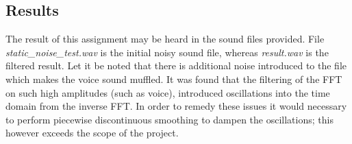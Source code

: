 \subsection{Results} %
\label{sub:results}
The result of this assignment may be heard in the sound files provided. File \emph{static\_noise\_test.wav} is the initial noisy sound file, whereas \emph{result.wav} is the filtered result. Let it be noted that there is additional noise introduced to the file which makes the voice sound muffled. It was found that the filtering of the FFT on such high amplitudes (such as voice), introduced oscillations into the time domain from the inverse FFT. In order to remedy these issues it would necessary to perform piecewise discontinuous smoothing to dampen the oscillations; this however exceeds the scope of the project.


